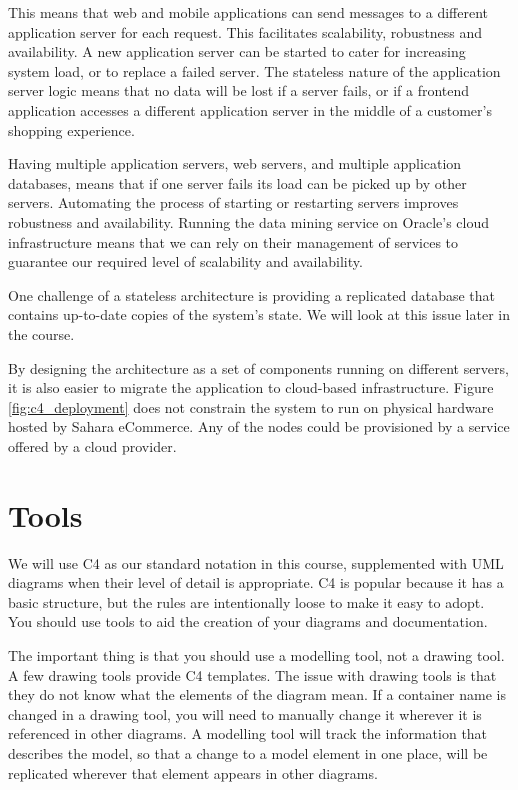 This means that web and mobile applications can send messages to a different application server for each request.
This facilitates scalability, robustness and availability.
A new application server can be started to cater for increasing system load, or to replace a failed server.
The stateless nature of the application server logic means that no data will be lost if a server fails,
or if a frontend application accesses a different application server in the middle of a customer's shopping experience.

Having multiple application servers, web servers, and multiple application databases,
means that if one server fails its load can be picked up by other servers.
Automating the process of starting or restarting servers improves robustness and availability.
Running the data mining service on Oracle's cloud infrastructure means that we can rely
on their management of services to guarantee our required level of scalability and availability.

One challenge of a stateless architecture is providing a replicated database that contains up-to-date copies of the system's state.
We will look at this issue later in the course.

By designing the architecture as a set of components running on different servers, it is also easier to migrate the application to cloud-based infrastructure.
Figure \ref{fig:c4_deployment} does not constrain the system to run on physical hardware hosted by Sahara eCommerce.
Any of the nodes could be provisioned by a service offered by a cloud provider.


\section{Tools}
We will use C4 as our standard notation in this course,
supplemented with UML diagrams when their level of detail is appropriate.
C4 is popular because it has a basic structure, but the rules are intentionally loose to make it easy to adopt.
You should use tools to aid the creation of your diagrams and documentation.

The important thing is that you should use a modelling tool, not a drawing tool.
A few drawing tools provide C4 templates.
The issue with drawing tools is that they do not know what the elements of the diagram mean.
If a container name is changed in a drawing tool, you will need to manually change it wherever it is referenced in other diagrams.
A modelling tool will track the information that describes the model, so that a change to a model element in one place,
will be replicated wherever that element appears in other diagrams.

